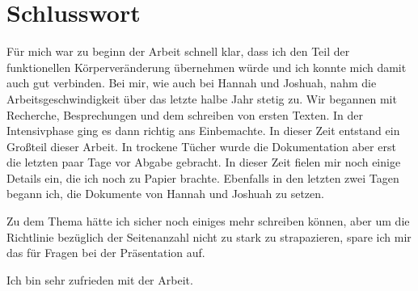 \section{Schlusswort}
Für mich war zu beginn der Arbeit schnell klar, dass ich den Teil der funktionellen Körperveränderung
übernehmen würde und ich konnte mich damit auch gut verbinden. Bei mir, wie auch bei Hannah und
Joshuah, nahm die Arbeitsgeschwindigkeit über das letzte halbe Jahr stetig zu. Wir begannen mit
Recherche, Besprechungen und dem schreiben von ersten Texten. In der Intensivphase ging es dann
richtig ans Einbemachte. In dieser Zeit entstand ein Großteil dieser Arbeit. In trockene Tücher wurde
die Dokumentation aber erst die letzten paar Tage vor Abgabe gebracht. In dieser Zeit fielen mir noch
einige Details ein, die ich noch zu Papier brachte. Ebenfalls in den letzten zwei Tagen begann ich,
die Dokumente von Hannah und Joshuah zu setzen.

Zu dem Thema hätte ich sicher noch einiges mehr schreiben können, aber um die Richtlinie bezüglich
der Seitenanzahl nicht zu stark zu strapazieren, spare ich mir das für Fragen bei der Präsentation
auf.

Ich bin sehr zufrieden mit der Arbeit.
